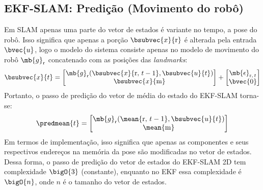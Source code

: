 \subsection{EKF-SLAM: Predição (Movimento do robô)}
\label{sec:ekf-slam-prediction}
Em SLAM apenas uma parte do vetor de estados é variante no tempo, a pose do 
robô. Isso significa que apenas a porção $\bsubvec{x}{\mathrm{r}}$ é alterada pela entrada $\bvec{u}$, logo o modelo do sistema consiste apenas no modelo de 
movimento do robô $\mb{g}_\mathrm{r}$ concatenado com as posições das \textit{landmarks}:
\begin{equation}
  \bsubvec{x}{t} = \begin{bmatrix}
    \mb{g}_\mathrm{r}(\bsubvec{x}{\mathrm{r}, \,t-1}, \bsubvec{u}{t}) \\
    \bsubvec{x}{\mathrm{m}}
  \end{bmatrix} + \begin{bmatrix} 
      \mb{\epsilon}_{\mathrm{r}, \,t} \\
      \bvec{0}
  \end{bmatrix}
  \label{eq:slam-prediction}
\end{equation}
Portanto, o passo de predição do vetor de média do estado do EKF-SLAM torna-se:
\begin{equation}
  \predmean{t} = \begin{bmatrix}
    \mb{g}_\mathrm{r}(\mean{\mathrm{r}, \,t-1}, \bsubvec{u}{t}) \\
      \mean{\mathrm{m}}
  \end{bmatrix}
\end{equation}
Em termos de implementação, isso significa que apenas as componentes e seus respectivos endereços na memória da 
pose são modificadas no vetor de estados. Dessa forma, o passo de predição do 
vetor de estados do EKF-SLAM 2D tem complexidade $\bigO{3}$ (constante), enquanto no EKF 
essa complexidade é $\bigO{n}$, onde $n$ é o tamanho do vetor de estados.

